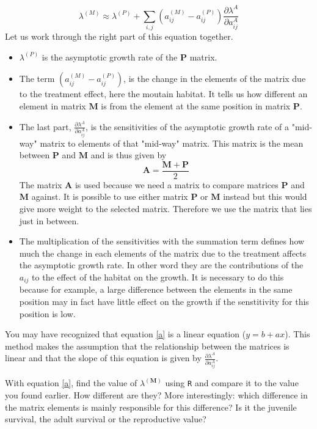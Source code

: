 \documentclass{article}\usepackage[]{graphicx}\usepackage[]{color}
\begin{document}
\begin{equation}\label{a}
\lambda^{(M)} \approx \lambda^{(P)}+\sum_{i,j}{(a^{(M)}_{ij}-a^{(P)}_{ij})} \frac{ \partial\lambda^{A}}{\partial a^{A}_{ij}}
\end{equation}
Let us work through the right part of this equation together. 
\begin{itemize}
\item $\lambda^{(P)}$ is the asymptotic growth rate of the $\boldsymbol{P}$ matrix. 
\item The term ${(a^{(M)}_{ij}-a^{(P)}_{ij})}$, is the change in the elements of the matrix due to the treatment effect, here the moutain habitat. It tells us how different an element in matrix $\boldsymbol{M}$ is from the element at the same position in matrix $\boldsymbol{P}$.
\item The last part, $\frac{ \partial\lambda^{A}}{\partial a^{A}_{ij}}$, is the sensitivities of the asymptotic growth rate of a "mid-way" matrix to elements of that "mid-way" matrix. This matrix is the mean between $\boldsymbol{P}$ and $\boldsymbol{M}$ and is thus given by 
\begin{equation}
\boldsymbol{A}=\frac{\boldsymbol{M}+\boldsymbol{P}}{2}
\end{equation}
The matrix $\boldsymbol{A}$ is used because we need a matrix to compare matrices $\boldsymbol{P}$ and $\boldsymbol{M}$ against. It is possible to use either matrix $\boldsymbol{P}$ or $\boldsymbol{M}$ instead but this would give more weight to the selected matrix. Therefore we use the matrix that lies just in between.
\item The multiplication of the sensitivities with the summation term defines how much the change in each elements of the matrix due to the treatment affects the asymptotic growth rate. In other word they are the contributions of the $a_{ij}$ to the effect of the habitat on the growth. It is necessary to do this because for example, a large difference between the elements in the same position may in fact have little effect on the growth if the senstitivity for this position is low. 
\end{itemize}

You may have recognized that equation \ref{a} is a linear equation ($y=b+ax$). This method makes the assumption that the relationship between the matrices is linear and that the slope of this equation is given by $\frac{ \partial\lambda^{A}}{\partial a^{A}_{ij}}$.


With equation \ref{a}, find the value of $\lambda^{(\boldsymbol{M})}$ using \texttt{R} and compare it to the value you found earlier. How different are they? More interestingly: which difference in the matrix elements is mainly responsible for this difference? Is it the juvenile survival, the adult survival or the reproductive value?\\[1.5ex]
\end{document}
